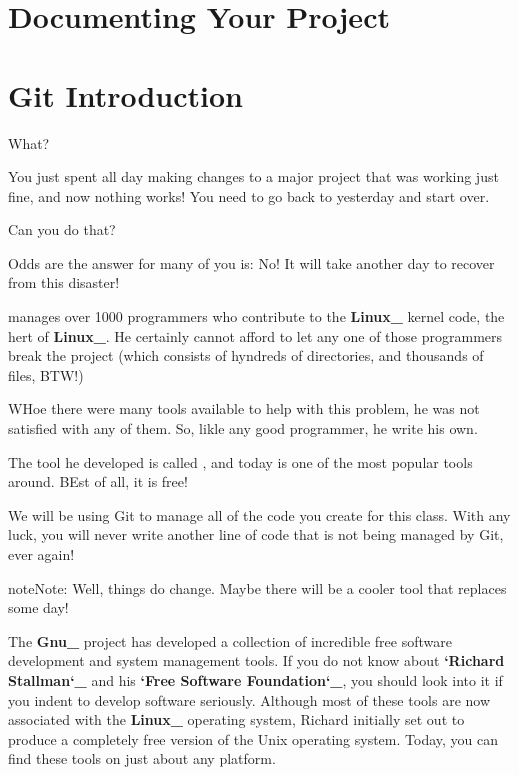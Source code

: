 \documentclass[letterpaper,11pt,english]{sphinxmanual}
\begin{document}
\chapter{Documenting Your Project}
\label{\detokenize{appendix/documentation:documenting-your-project}}\label{\detokenize{appendix/documentation::doc}}

\chapter{Git Introduction}
\label{\detokenize{appendix/git-introduction:git-introduction}}\label{\detokenize{appendix/git-introduction::doc}}
What?

You just spent all day making changes to a major project that was working just
fine, and now nothing works! You need to go back to yesterday and start over.

Can you do that?

Odds are the answer for many of you is: No! It will take another day to recover
from this disaster!

 manages over 1000 programmers who contribute to the
{\color{red}\bfseries{}Linux\_} kernel code, the hert of {\color{red}\bfseries{}Linux\_}. He certainly cannot afford to let any
one of those programmers break the project (which consists of hyndreds of
directories, and thousands of files, BTW!)

WHoe there were many tools available to help with this problem, he was not satisfied with any of them. So, likle any good programmer, he write his own.

The tool he developed is called , and today  is one of the most popular  tools around. BEst of all, it is free!

We will be using Git to manage all of the code you create for this class. With
any luck, you will never write another line of code that is not being managed
by Git, ever again!

\begin{sphinxadmonition}{note}{Note:}
Well, things do change. Maybe there will be a cooler tool that replaces
 some day!
\end{sphinxadmonition}

The {\color{red}\bfseries{}Gnu\_} project has developed a collection of incredible free software
development and system management tools. If you do not know about {\color{red}\bfseries{}{}`Richard
Stallman{}`\_} and his {\color{red}\bfseries{}{}`Free Software Foundation{}`\_}, you should look into it if you
indent to develop software seriously. Although most of these tools are now
associated with the {\color{red}\bfseries{}Linux\_} operating system, Richard initially set out to
produce a completely free version of the Unix operating system. Today, you can
find these tools on just about any platform.
\end{document}
